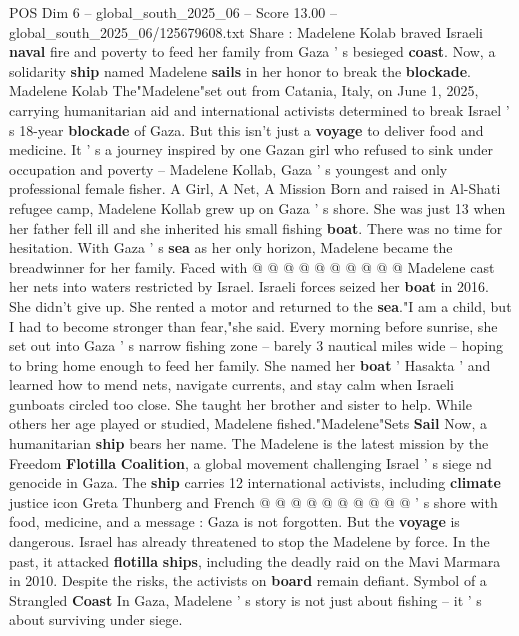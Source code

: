 \begin{textsample}{POS Dim 6 – global\_south\_2025\_06 – Score 13.00 – global\_south\_2025\_06/125679608.txt}  \label{ex:f6_pos_019}
Share : Madelene Kolab braved Israeli \textbf{naval} fire and poverty to feed her family from Gaza ' s besieged \textbf{coast}.
Now, a solidarity \textbf{ship} named Madelene \textbf{sails} in her honor to break the \textbf{blockade}.
Madelene Kolab The"Madelene"set out from Catania, Italy, on June 1, 2025, carrying humanitarian aid and international activists determined to break Israel ' s 18-year \textbf{blockade} of Gaza.
But this isn't just a \textbf{voyage} to deliver food and medicine.
It ' s a journey inspired by one Gazan girl who refused to sink under occupation and poverty -- Madelene Kollab, Gaza ' s youngest and only professional female fisher.
A Girl, A Net, A Mission Born and raised in Al-Shati refugee camp, Madelene Kollab grew up on Gaza ' s shore.
She was just 13 when her father fell ill and she inherited his small fishing \textbf{boat}.
There was no time for hesitation.
With Gaza ' s \textbf{sea} as her only horizon, Madelene became the breadwinner for her family.
Faced with @ @ @ @ @ @ @ @ @ @ Madelene cast her nets into waters restricted by Israel.
Israeli forces seized her \textbf{boat} in 2016.
She didn't give up.
She rented a motor and returned to the \textbf{sea}."I am a child, but I had to become stronger than fear,"she said.
Every morning before sunrise, she set out into Gaza ' s narrow fishing zone -- barely 3 nautical miles wide -- hoping to bring home enough to feed her family.
She named her \textbf{boat} ' Hasakta ' and learned how to mend nets, navigate currents, and stay calm when Israeli gunboats circled too close.
She taught her brother and sister to help.
While others her age played or studied, Madelene fished."Madelene"Sets \textbf{Sail} Now, a humanitarian \textbf{ship} bears her name.
The Madelene is the latest mission by the Freedom \textbf{Flotilla} \textbf{Coalition}, a global movement challenging Israel ' s siege nd genocide in Gaza.
The \textbf{ship} carries 12 international activists, including \textbf{climate} justice icon Greta Thunberg and French @ @ @ @ @ @ @ @ @ @ ' s shore with food, medicine, and a message : Gaza is not forgotten.
But the \textbf{voyage} is dangerous.
Israel has already threatened to stop the Madelene by force.
In the past, it attacked \textbf{flotilla} \textbf{ships}, including the deadly raid on the Mavi Marmara in 2010.
Despite the risks, the activists on \textbf{board} remain defiant.
Symbol of a Strangled \textbf{Coast} In Gaza, Madelene ' s story is not just about fishing -- it ' s about surviving under siege.

\end{textsample}
